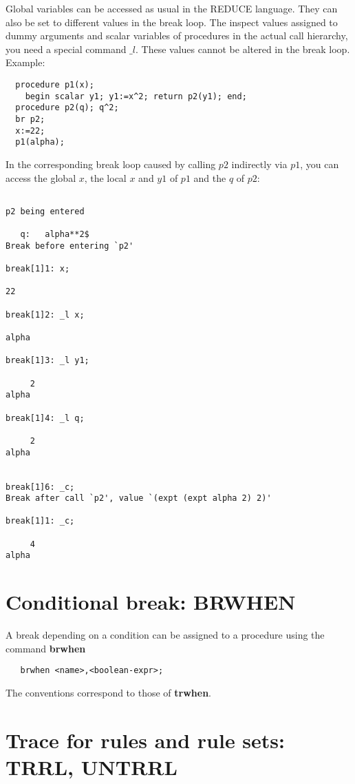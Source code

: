 Global variables can be accessed as usual in the {\small REDUCE} language.
They can also be set to different values in the break loop.
The inspect values assigned to dummy arguments and scalar variables of
procedures in the actual call hierarchy, you need a special command $\_l$.
These values cannot be altered in the break loop.
Example:
\begin{verbatim}
  procedure p1(x); 
    begin scalar y1; y1:=x^2; return p2(y1); end;
  procedure p2(q); q^2;
  br p2;
  x:=22;
  p1(alpha);
\end{verbatim}
In the corresponding break loop caused by calling $p2$ 
indirectly via $p1$, you can access the global $x$, the
local $x$ and $y1$ of $p1$ and the $q$ of $p2$:
\begin{verbatim}

p2 being entered

   q:   alpha**2$
Break before entering `p2'

break[1]1: x;

22

break[1]2: _l x;

alpha

break[1]3: _l y1;

     2
alpha

break[1]4: _l q;

     2
alpha


break[1]6: _c;
Break after call `p2', value `(expt (expt alpha 2) 2)'

break[1]1: _c;

     4
alpha
\end{verbatim}

\section{Conditional break: BRWHEN}

A break depending on a condition can be assigned to a procedure
using the command {\bf brwhen}
\begin{verbatim}
   brwhen <name>,<boolean-expr>; 
\end{verbatim}
The conventions correspond to those of {\bf trwhen}.

\section{Trace for rules and rule sets: TRRL, UNTRRL}

